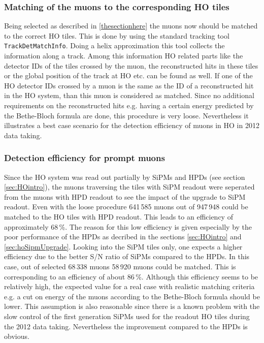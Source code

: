		\subsubsection{Matching of the muons to the corresponding HO tiles}
			Being selected as described in \ref{thesectionhere} the muons now should be matched to the correct HO tiles.
			This is done by using the standard tracking tool \verb+TrackDetMatchInfo+.
			Doing a helix approximation this tool collects the information along a track.
			Among this information HO related parts like the detector IDs of the tiles crossed by the muon, the reconstructed hits in these tiles or the global position of the track at HO etc. can be
			found as well.
			If one of the HO detector IDs crossed by a muon is the same as the ID of a reconstructed hit in the HO system, than this muon is considered as matched.
			Since no additional requirements on the reconstructed hits e.g. having a certain energy predicted by the Bethe-Bloch formula are done, this procedure is very loose.
			Nevertheless it illustrates a best case scenario for the detection efficiency of muons in HO in 2012 data taking.
		\subsubsection{Detection efficiency for prompt muons}
			Since the HO system was read out partially by SiPMs and HPDs (see section \ref{sec:HOintro}), the muons traversing the tiles with SiPM readout were seperated from the muons with HPD readout to
			see the impact of the upgrade to SiPM readout.
			Even with the loose procedure 641\,585 muons out of 947\,948 could be matched to the HO tiles with HPD readout.
			This leads to an efficiency of approximately 68\,\%.
			The reason for this low efficiency is given especially by the poor performance of the HPDs as decribed in the sections \ref{sec:HOintro} and \ref{sec:hoSipmUpgrade}.
			Looking into the SiPM tiles only, one expects a higher efficiency due to the better S/N ratio of SiPMs compared to the HPDs.
			In this case, out of selected 68\,338 muons 58\,920 muons could be matched.
			This is corresponding to an efficiency of about 86\,\%.
			Although this efficiency seems to be relatively high, the expected value for a real case with realistic matching criteria e.g. a cut on energy of the muons according to the Bethe-Bloch formula
			should be lower.
			This assumption is also reasonable since there is a known problem with the slow control of the first generation SiPMs used for the readout HO tiles during the 2012 data taking.
			Nevertheless the improvement compared to the HPDs is obvious.
